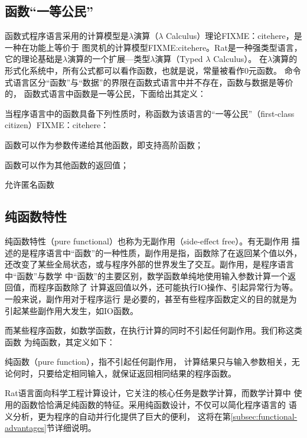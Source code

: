 \subsection{函数“一等公民”}
函数式程序语言采用的计算模型是$\lambda$演算（$\lambda$ Calculus）理论FIXME：citehere，是一种在功能上等价于
图灵机的计算模型FIXME:citehere。Rat是一种强类型语言，
它的理论基础是$\lambda$演算的一个扩展---类型$\lambda$演算（Typed $\lambda$ Calculus）。
在$\lambda$演算的形式化系统中，所有公式都可以看作函数，也就是说，常量被看作0元函数。
命令式语言区分“函数”与“数据”的界限在函数式语言中并不存在，函数与数据是等价的，
函数式语言中函数是一等公民，下面给出其定义：
\begin{definition}
  当程序语言中的函数具备下列性质时，称函数为该语言的“一等公民”（first-class citizen）FIXME：citehere：
  \begin{compactitem}
    \item 函数可以作为参数传递给其他函数，即支持高阶函数；
    \item 函数可以作为其他函数的返回值；
    \item 允许匿名函数
  \end{compactitem}
\end{definition}


\subsection{纯函数特性}
纯函数特性（pure functional）也称为无副作用（side-effect free）。有无副作用
描述的是程序语言中“函数”的一种性质，副作用是指，函数除了在返回某个值以外，
还改变了某些全局状态，或与程序外部的世界发生了交互。副作用，是程序语言中“函数”与数学
中“函数”的主要区别，数学函数单纯地使用输入参数计算一个返回值，而程序函数除了
计算返回值以外，还可能执行IO操作、引起异常行为等。一般来说，副作用对于程序运行
是必要的，甚至有些程序函数定义的目的就是为引起某些副作用大发生，如IO函数。

而某些程序函数，如数学函数，在执行计算的同时不引起任何副作用。我们称这类函数
为纯函数，其定义如下：
\begin{definition}
纯函数（pure function），指不引起任何副作用，
计算结果只与输入参数相关，无论何时，只要给定相同输入，就保证返回相同结果的程序函数。
\end{definition}

Rat语言面向科学工程计算设计，它关注的核心任务是数学计算，而数学计算中
使用的函数恰恰满足纯函数的特征。采用纯函数设计，不仅可以简化程序语言的
语义分析，更为程序的自动并行化提供了巨大的便利，
这将在第\ref{subsec:functional-advantages}节详细说明。

